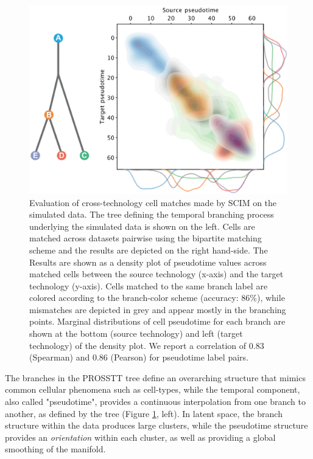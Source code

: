 \begin{figure}[htp]
    \centering
    \includegraphics[width=\textwidth]{figures/integration/pseudotime-kde-tree-inverted_thick.png}
    \caption{
    Evaluation of cross-technology cell matches made by SCIM on the simulated data. The tree defining the temporal branching process underlying the simulated data is shown on the left. Cells are matched across datasets pairwise using the bipartite matching scheme and the results are depicted on the right hand-side. The Results are shown as a density plot of pseudotime values across matched cells between the source technology (x-axis) and the target technology (y-axis). Cells matched to the same branch label are colored according to the branch-color scheme (accuracy: 86\%), while mismatches are depicted in grey and appear mostly in the branching points. Marginal distributions of cell pseudotime for each branch are shown at the bottom (source technology) and left (target technology) of the density plot. We report a correlation of 0.83 (Spearman) and 0.86 (Pearson) for pseudotime label pairs.
    }
    \label{fig:prosstt5-pseudotime-inverted}
\end{figure}


The branches in the PROSSTT tree define an overarching structure that mimics common cellular phenomena such as cell-types, while the temporal component, also called "pseudotime", provides a continuous interpolation from one branch to another, as defined by the tree  (Figure \ref{fig:prosstt5-pseudotime-inverted}, left).
In latent space, the branch structure within the data produces large clusters, while the pseudotime structure provides an \textit{orientation} within each cluster, as well as providing a global smoothing of the manifold.

